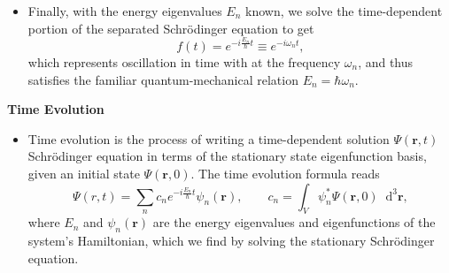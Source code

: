 \documentclass[11pt, a4paper]{article}
\newcommand{\diff}{\mathop{}\!\mathrm{d}} %
\newcommand{\dr}{\diff^{3} \r}  %
\newcommand{\Schro}{Schr\"{o}dinger\xspace}
\newcommand{\Ham}{Hamiltonian\xspace}
\renewcommand{\vec}[1]{\bm{#1}}  %
\renewcommand{\r}{\vec{r}}  %
\newcommand{\p}{\psi}  %
\renewcommand{\P}{\Psi}  %
\begin{document}
\begin{itemize}
	\item Finally, with the energy eigenvalues $ E_{n} $ known, we solve the time-dependent portion of the separated \Schro equation to get
	\begin{equation*}
		f(t) = e^{-i\frac{E_{n}}{\hbar}t} \equiv e^{-i\omega_{n}t},
	\end{equation*}
	which represents oscillation in time with at the frequency $ \omega_{n} $, and thus satisfies the familiar quantum-mechanical relation $ E_{n} = \hbar \omega_{n} $. 

\end{itemize}
	
\textbf{Time Evolution}
\begin{itemize}
    \item Time evolution is the process of writing a time-dependent solution $ \P(\r, t) $ \Schro equation in terms of the stationary state eigenfunction basis, given an initial state $ \Psi(\r, 0) $. The time evolution formula reads
    \begin{equation*}
        \Psi(r, t) = \sum_{n} c_{n} e^{-i \frac{E_{n}}{\hbar}t}\psi_{n}(\r), \qquad c_{n} = \int_{V} \p_{n}^{*}\P(\r, 0)\dr,
    \end{equation*}
    where $ E_{n} $ and $ \psi_{n}(\r) $ are the energy eigenvalues and eigenfunctions of the system's \Ham, which we find by solving the stationary \Schro equation.
\end{itemize}
\end{document}
